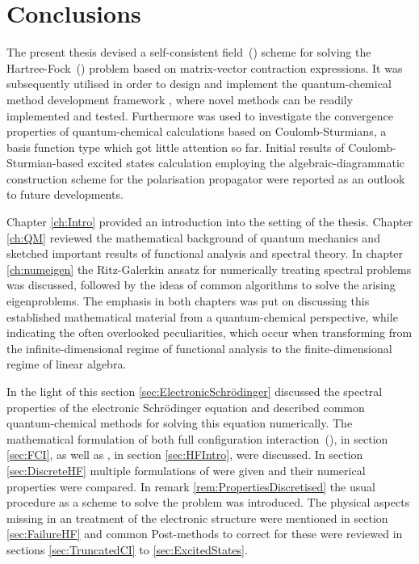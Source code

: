 \chapter{Conclusions}
\label{ch:Conclusion}

\noindent
The present thesis devised a self-consistent field~(\SCF)
scheme for solving the Hartree-Fock~(\HF) problem
based on matrix-vector contraction expressions.
It was subsequently utilised in order to design and implement the
quantum-chemical method development framework \molsturm,
where novel methods can be readily implemented and tested.
Furthermore \molsturm was used to investigate the convergence properties
of quantum-chemical calculations
based on Coulomb-Sturmians,
a basis function type which got little attention so far.
Initial results of Coulomb-Sturmian-based excited states
calculation employing the algebraic-diagrammatic construction scheme
for the polarisation propagator were reported
as an outlook to future developments.


Chapter \ref{ch:Intro} provided an introduction into the setting
of the thesis.
Chapter \ref{ch:QM}
reviewed the mathematical background of quantum mechanics
and sketched important results of functional analysis
and spectral theory.
In chapter \ref{ch:numeigen} the Ritz-Galerkin ansatz
for numerically treating spectral problems
was discussed, followed by the ideas of common algorithms
to solve the arising eigenproblems.
The emphasis in both chapters
was put on discussing this established mathematical
material from a quantum-chemical perspective,
while indicating the often overlooked peculiarities,
which occur when transforming from the infinite-dimensional regime
of functional analysis to the finite-dimensional regime of linear algebra.


In the light of this section \ref{sec:ElectronicSchrödinger}
discussed the spectral properties
of the electronic Schrödinger equation and
described common quantum-chemical methods
for solving this equation numerically.
The mathematical formulation of both full configuration interaction~(\FCI),
in section \ref{sec:FCI},
as well as \HF, in section \ref{sec:HFIntro}, were discussed.
In section \ref{sec:DiscreteHF} multiple formulations of \HF were given
and their numerical properties were compared.
In remark \ref{rem:PropertiesDiscretised}
the usual \SCF procedure
as a scheme to solve the \HF problem was introduced.
The physical aspects missing in an \HF treatment of the electronic
structure were mentioned in section \ref{sec:FailureHF}
and common Post-\HF methods to correct for these were
reviewed in sections \ref{sec:TruncatedCI} to \ref{sec:ExcitedStates}.

